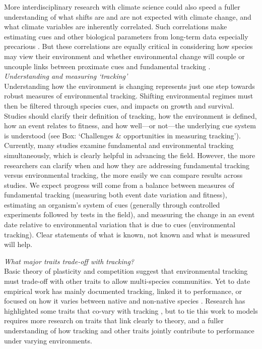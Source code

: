 \documentclass[11pt,letterpaper]{article}
\newcommand{\R}[1]{\label{#1}\linelabel{#1}}
\begin{document}
More interdisciplinary research with climate science could also speed a fuller understanding of what shifts are and are not expected with climate change, and what climate variables are inherently correlated. Such correlations make estimating cues and other biological parameters from long-term data especially precarious \citep{tansey2017}. But these correlations are equally critical in considering how species may view their environment and whether environmental change will couple or uncouple links between proximate cues and fundamental tracking \citep{bonamour2019}. \\

\emph{Understanding and measuring `tracking'} \\
Understanding how the environment is changing represents just one step towards robust measures of environmental tracking. Shifting environmental regimes must then be filtered through species cues, and impacts on growth and survival. Studies should clarify their definition of tracking, how the environment is defined, how an event relates to fitness, and how well---or not---the underlying cue system is understood (see Box: `Challenges \& opportunities in measuring tracking'). Currently, many studies examine fundamental and environmental tracking simultaneously\R{r3misc6}\citep[e.g.,][]{visser2006,charm2008,Cleland:2012,yang2020}, which is clearly helpful in advancing the field. However, the more researchers can clarify when and how they are addressing fundamental tracking versus environmental tracking, the more easily we can compare results across studies. We expect progress will come from a balance between measures of fundamental tracking (measuring both event date variation and fitness), estimating an organism's system of cues (generally through controlled experiments followed by tests in the field), and measuring the change in an event date relative to environmental variation that is due to cues (environmental tracking). \R{r4miscvague} Clear statements of what is known, not known and what is measured will help.

\emph{What major traits trade-off with tracking?} \\ 
Basic theory of plasticity and competition suggest that environmental tracking must trade-off with other traits to allow multi-species communities. Yet to date empirical work has mainly documented tracking, linked it to performance, or focused on how it varies between native and non-native species \citep{Willis:2010al,wolkovichAmBot2013,Zettlemoyer2019}. Research has highlighted some traits that co-vary with tracking \citep[e.g.,][]{kharouba2014,lasky2016,Zhu2016BioLetters}, but to tie this work to models requires more research on traits that link clearly to theory, and a fuller understanding of how tracking and other traits jointly contribute to performance under varying environments. 
\end{document}
